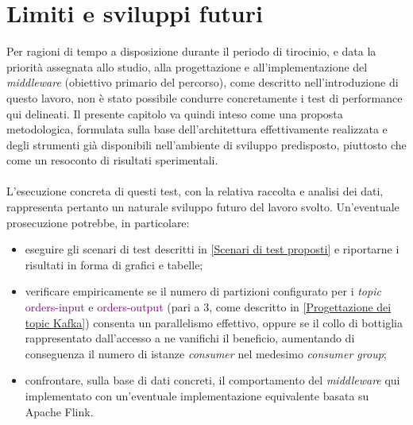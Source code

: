 \section{Limiti e sviluppi futuri}
Per ragioni di tempo a disposizione durante il periodo di tirocinio, e data la priorità assegnata allo studio, alla progettazione e all'implementazione del \textit{middleware} (obiettivo primario del percorso), come descritto nell'introduzione di questo lavoro, non è stato possibile condurre concretamente i test di performance qui delineati. 
Il presente capitolo va quindi inteso come una proposta metodologica, formulata sulla base dell'architettura effettivamente realizzata e degli strumenti già disponibili nell'ambiente di sviluppo predisposto, piuttosto che come un resoconto di risultati sperimentali. \\ \\
L'esecuzione concreta di questi test, con la relativa raccolta e analisi dei dati, rappresenta pertanto un naturale sviluppo futuro del lavoro svolto. 
Un'eventuale prosecuzione potrebbe, in particolare:
\begin{itemize}
    \item eseguire gli scenari di test descritti in \ref{Scenari di test proposti} e riportarne i risultati in forma di grafici e tabelle;
    \item verificare empiricamente se il numero di partizioni configurato per i \textit{topic} \textcolor{purple}{orders-input} e \textcolor{purple}{orders-output} (pari a 3, come descritto in \ref{Progettazione dei topic Kafka}) consenta un parallelismo effettivo, oppure se il collo di bottiglia rappresentato dall'accesso a  ne vanifichi il beneficio, aumentando di conseguenza il numero di istanze \textit{consumer} nel medesimo \textit{consumer group};
    \item confrontare, sulla base di dati concreti, il comportamento del \textit{middleware} qui implementato con un'eventuale implementazione equivalente basata su Apache Flink.
\end{itemize}

\newpage
